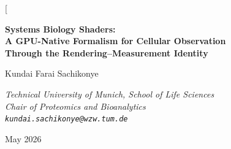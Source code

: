 \documentclass[11pt,twocolumn,a4paper]{article}
\begin{document}
\twocolumn[
\begin{@twocolumnfalse}
\begin{center}

{\LARGE\bfseries Systems Biology Shaders:\\[4pt]
A GPU-Native Formalism for Cellular Observation\\[4pt]
Through the Rendering--Measurement Identity}

\vspace{12pt}

{\large Kundai Farai Sachikonye}

\vspace{6pt}

{\small\itshape Technical University of Munich, School of Life Sciences\\[0.3em]
Chair of Proteomics and Bioanalytics\\[0.3em]
\texttt{kundai.sachikonye@wzw.tum.de}}

\vspace{6pt}

{\small May 2026}

\vspace{14pt}


\end{center}
\end{@twocolumnfalse}
\end{document}
